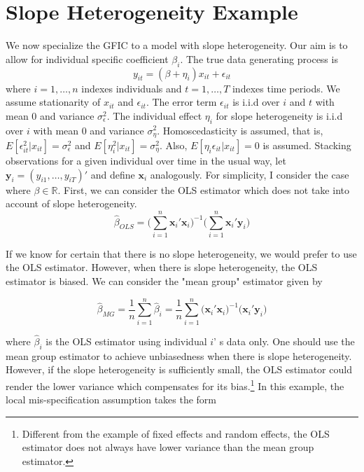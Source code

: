 \documentclass[12pt]{article}
\begin{document}
\section{Slope Heterogeneity Example}
\label{sec:panel}
We now specialize the GFIC to a model with slope heterogeneity. Our aim is to allow for individual specific coefficient $\beta_i$. The true data generating process is 
	\begin{equation}
				y_{it} = (\beta+\eta_i) x_{it} + \epsilon_{it}
	\end{equation}
where $i = 1, \hdots, n$ indexes individuals and $t=1, \hdots, T$  indexes time periods. We assume stationarity of $x_{it}$ and $\epsilon_{it}$. The error term $\epsilon_{it}$ is i.i.d over $i$ and $t$ with mean 0 and variance $\sigma_\epsilon^2$. The individual effect $\eta_i$ for slope heterogeneity is i.i.d over $i$ with mean 0 and variance $\sigma_\eta^2$. Homoscedasticity is assumed, that is, $E[\epsilon_{it}^2 | x_{it}] = \sigma_\epsilon^2$ and $E[\eta_i^2 | x_{it}] = \sigma_\eta^2$. Also, $E[\eta_i \epsilon_{it} | x_{it}] = 0$ is assumed. Stacking observations for a given individual over time in the usual way, let $\mathbf{y}_i = (y_{i1}, \ldots, y_{iT})'$ and define $\mathbf{x}_i$ analogously. For simplicity, I consider the case where $\beta \in \mathbb{R}$. First, we can consider the OLS estimator which does not take into account of slope heterogeneity. 
	\begin{equation}
\widehat{\beta}_{OLS} = \bigg(\sum_{i=1}^{n} \mathbf{x}_i'  \mathbf{x}_i\bigg)^{-1}\bigg(\sum_{i=1}^{n} \mathbf{x}_i' \mathbf{y}_i   \bigg)	
	\end{equation}
	
If we know for certain that there is no slope heterogeneity, we would prefer to use the OLS estimator. However, when there is slope heterogeneity, the OLS estimator is biased. We can consider the "mean group" estimator given by 


	\begin{equation}
\widehat{\beta}_{MG}  = \frac{1}{n}\sum_{i=1}^n \widehat{\beta}_i 
= \frac{1}{n} \sum_{i=1}^n \bigg( \mathbf{x}_i'  \mathbf{x}_i\bigg)^{-1}\bigg( \mathbf{x}_i'  \mathbf{y}_i   \bigg)
\end{equation}

where $\widehat{\beta}_i$ is the OLS estimator using individual $i$'
s data only. One should use the mean group estimator to achieve unbiasedness when there is slope heterogeneity. However, if the slope heterogeneity is sufficiently small, the OLS estimator could render the lower variance which compensates for its bias.\footnote{Different from the example of fixed effects and random effects, the OLS estimator does not always have lower variance than the mean group estimator.} In this example, the local mis-specification assumption takes the form  
\end{document}
